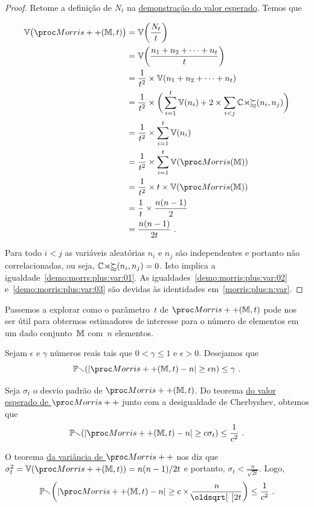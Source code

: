 \begin{proof}
  Retome a definição de $N_t$ na \hyperref[demo:morris:plus]{demonstração do valor esperado}. Temos que

  \begin{align}
    \Vbb\big(\Morrispp(\Mbb,t)\big) & = \Vbb\bigg(\frac{N_t}{t}\bigg) \nonumber\\
    & = \Vbb\bigg(\frac{n_1 + n_2 + \dots +n_t}{t} \bigg) \nonumber\\
    &= \frac{1}{t^2} \times \Vbb(n_1 + n_2 + \dots + n_t)  \nonumber\\
    &= \frac{1}{t^2} \times \bigg(\sum_{i=1}^t\Vbb(n_i) + 2\times \sum_{i<j}\Cov(n_i,n_j)\bigg)\\
    &= \frac{1}{t^2} \times \sum_{i=1}^t\Vbb(n_i) \label{demo:morrs:plus:var:01}\\
    &= \frac{1}{t^2} \times \sum_{i=1}^t\Vbb(\Morris(\Mbb)) \label{demo:morris:plus:var:02} \\
    &= \frac{1}{t^2} \times t \times \Vbb(\Morris(\Mbb)) \nonumber\\
    &= \frac{1}{t} \times \frac{n(n-1)}{2} \label{demo:morris:plus:var:03}\\
    &= \frac{n(n-1)}{2t}\ . \nonumber
  \end{align}
  
  Para todo $i < j$ as variáveis aleatórias $n_i$ e $n_j$ são independentes e portanto não correlacionadas,
  ou seja, $\mathbb{Cov}(n_i,n_j) = 0$. Isto implica a igualdade~\eqref{demo:morrs:plus:var:01}.
  As igualdades~\eqref{demo:morris:plus:var:02} e~\eqref{demo:morris:plus:var:03} são devidas às identidades 
  em~\eqref{morris:plus:n:var}.
\end{proof}

Passemos a explorar como o parâmetro~$t$ de $\Morrispp(\Mbb,t)$ pode nos ser útil para obtermos estimadores de interesse
para o número de elementos em um dado conjunto~$\mathbb{M}$ com~$n$ elementos.

Sejam $\epsilon$ e $\gamma$ números reais tais que $0 < \gamma \leq 1$ e $\epsilon > 0$. Desejamos que
\[ \Pbb(|\Morrispp(\Mbb,t)-n| \geq \epsilon n) \leq \gamma \ . \]

Seja $\sigma_t$ o desvio padrão de $\Morrispp(\Mbb,t)$. Do teorema 
\hyperref[morris:plus:expected_value]{do valor esperado de $\Morrispp$} junto com a desigualdade de Cherbyshev, obtemos 
que
\[ \Pbb(|\Morrispp(\Mbb,t)-n| \geq c\sigma_t) \leq \frac{1}{c^2} \ . \]

O teorema \hyperref[morris:plus:variance]{da variância de $\Morrispp$} nos diz que 
$\sigma^2_t = \Vbb(\Morrispp(\Mbb, t)) = n(n-1)/2t$ e portanto, $\sigma_t < \frac{n}{\sqrt{2t}}$. Logo, 
\begin{align}
  \Pbb\bigg(|\Morrispp(\Mbb,t)-n| \geq c \times \frac{n}{\sqrt{2t}}\bigg) \leq \frac{1}{c^2} \ . 
  \label{morris:plus:prob:01}
\end{align}

